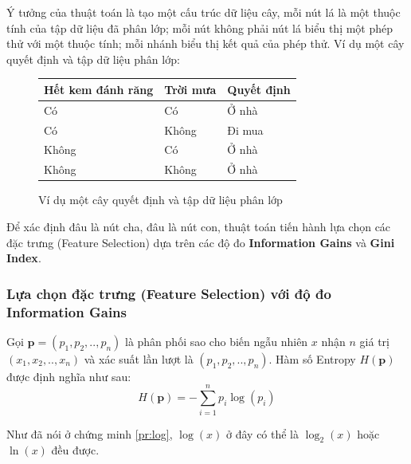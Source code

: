 \documentclass[12pt]{article}
\begin{document}
Ý tưởng của thuật toán là tạo một cấu trúc dữ liệu cây, mỗi nút lá là một thuộc tính của tập dữ liệu đã phân lớp; mỗi nút không phải nút lá biểu thị một phép thử với một thuộc tính; mỗi nhánh biểu thị kết quả của phép thử. Ví dụ một cây quyết định và tập dữ liệu phân lớp:
\begin{figure}[H]
\begin{multicols}{2}

\begin{tabular}{|l|l|l|}
	\hline
	Hết kem đánh răng & Trời mưa & Quyết định \\
	\hline
	Có & Có & Ở nhà \\
	Có & Không & Đi mua \\
	Không & Có & Ở nhà \\
	Không & Không & Ở nhà \\
	\hline
\end{tabular}
\end{multicols}
\caption{Ví dụ một cây quyết định và tập dữ liệu phân lớp}
\end{figure}
Để xác định đâu là nút cha, đâu là nút con, thuật toán tiến hành lựa chọn các đặc trưng (Feature Selection) dựa trên các độ đo \textbf{Information Gains} và \textbf{Gini Index}.

\subsubsection{Lựa chọn đặc trưng (Feature Selection) với độ đo Information Gains}
Gọi $\mathbf{p} = (p_1, p_2, .., p_n)$ là phân phối sao cho biến ngẫu nhiên $x$ nhận $n$ giá trị $(x_1, x_2, .., x_n)$ và xác suất lần lượt là $(p_1, p_2, .., p_n)$. Hàm số Entropy $H(\mathbf{p})$ được định nghĩa như sau:
\begin{equation}
H(\mathbf{p}) = -\sum_{i = 1}^n p_i \log(p_i)
\end{equation}

Như đã nói ở chứng minh \ref{pr:log}, $\log(x)$ ở đây có thể là $\log_2(x)$ hoặc $\ln(x)$ đều được.
\end{document}
